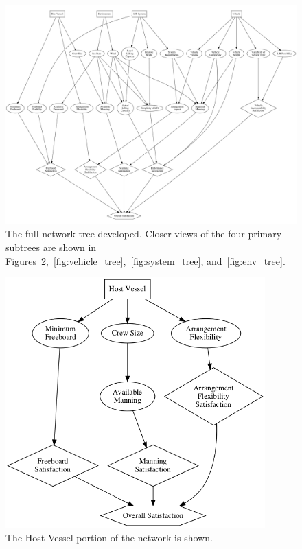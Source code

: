 \documentclass{svproc}
\begin{document}
\begin{figure}[htb]
\begin{adjustwidth}{-0.5cm}{-.5cm} 
\centering
\includegraphics[width=13.2cm]{whole_tree.png}
\caption{The full network tree developed. Closer views of the four primary subtrees are shown in Figures~\ref{fig:host_tree},~\ref{fig:vehicle_tree},~\ref{fig:system_tree}, and~\ref{fig:env_tree}.}
\label{fig:whole_tree}
\end{adjustwidth} 
\end{figure}

\begin{figure}[htb]
\begin{adjustwidth}{-0.5cm}{-.5cm} 
\centering
\includegraphics[width=10cm]{host_vessel_tree.png}
\caption{The Host Vessel portion of the network is shown.}
\label{fig:host_tree}
\end{adjustwidth} 
\end{figure}
\end{document}
